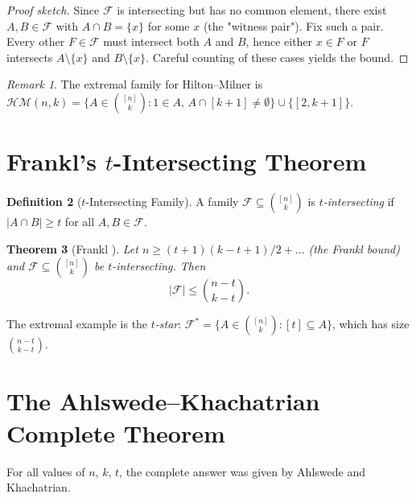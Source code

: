 \documentclass[12pt,a4paper]{amsart}
\newtheorem{theorem}{Theorem}[section]
\theoremstyle{definition}
\newtheorem{definition}[theorem]{Definition}
\theoremstyle{remark}
\newtheorem{remark}[theorem]{Remark}
\begin{document}
\begin{proof}[Proof sketch]
Since $\mathcal{F}$ is intersecting but has no common element, there exist
$A, B \in \mathcal{F}$ with $A \cap B = \{x\}$ for some $x$ (the "witness pair").
Fix such a pair. Every other $F \in \mathcal{F}$ must intersect both $A$ and $B$,
hence either $x \in F$ or $F$ intersects $A \setminus \{x\}$ and $B \setminus \{x\}$.
Careful counting of these cases yields the bound.
\end{proof}

\begin{remark}
The extremal family for Hilton--Milner is
$\mathcal{HM}(n,k) = \{A \in \binom{[n]}{k} : 1 \in A,\, A \cap [k+1] \neq \emptyset\}
\cup \{[2, k+1]\}$.
\end{remark}

\section{Frankl's $t$-Intersecting Theorem}\label{sec:frankl}

\begin{definition}[$t$-Intersecting Family]
A family $\mathcal{F} \subseteq \binom{[n]}{k}$ is \emph{$t$-intersecting} if
$|A \cap B| \geq t$ for all $A, B \in \mathcal{F}$.
\end{definition}

\begin{theorem}[Frankl \cite{Frankl1977}]\label{thm:frankl_t}
Let $n \geq (t+1)(k-t+1)/2 + \ldots$ (the Frankl bound) and $\mathcal{F} \subseteq
\binom{[n]}{k}$ be $t$-intersecting. Then
\[
  |\mathcal{F}| \leq \binom{n-t}{k-t}.
\]
\end{theorem}

The extremal example is the \emph{$t$-star}:
$\mathcal{F}^* = \{A \in \binom{[n]}{k} : [t] \subseteq A\}$, which has size
$\binom{n-t}{k-t}$.

\section{The Ahlswede--Khachatrian Complete Theorem}\label{sec:ak}

For all values of $n$, $k$, $t$, the complete answer was given by Ahlswede and
Khachatrian.
\end{document}
